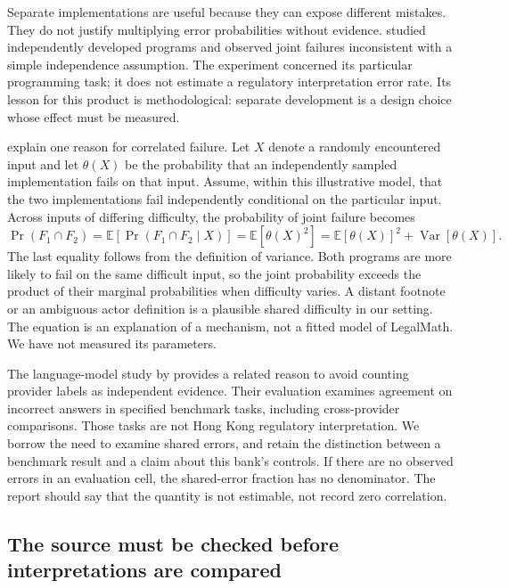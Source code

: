 Separate implementations are useful because they can expose different mistakes.
They do not justify multiplying error probabilities without evidence.
\citet{knight1986diversity} studied independently developed programs and observed
joint failures inconsistent with a simple independence assumption. The experiment
concerned its particular programming task; it does not estimate a regulatory
interpretation error rate. Its lesson for this product is methodological:
separate development is a design choice whose effect must be measured.

\citet[section 4.1]{littlewood2001diversity} explain one reason for correlated
failure. Let $X$ denote a randomly encountered input and let $\theta(X)$ be the
probability that an independently sampled implementation fails on that input.
Assume, within this illustrative model, that the two implementations fail
independently conditional on the particular input. Across inputs of differing
difficulty, the probability of joint failure becomes
\begin{equation}
 \Pr(F_1\cap F_2)
 = \mathbb{E}[\Pr(F_1\cap F_2\mid X)]
 = \mathbb{E}[\theta(X)^2]
 = \mathbb{E}[\theta(X)]^2+\operatorname{Var}[\theta(X)].
 \label{eq:round11-shared-difficulty}
\end{equation}
The last equality follows from the definition of variance. Both programs are
more likely to fail on the same difficult input, so the joint probability exceeds
the product of their marginal probabilities when difficulty varies. A distant
footnote or an ambiguous actor definition is a plausible shared difficulty in
our setting. The equation is an explanation of a mechanism, not a fitted model
of LegalMath. We have not measured its parameters.

The language-model study by \citet{kim2025correlated} provides a related reason
to avoid counting provider labels as independent evidence. Their evaluation
examines agreement on incorrect answers in specified benchmark tasks, including
cross-provider comparisons. Those tasks are not Hong Kong regulatory
interpretation. We borrow the need to examine shared errors, and retain the
distinction between a benchmark result and a claim about this bank's controls.
If there are no observed errors in an evaluation cell, the shared-error fraction
has no denominator. The report should say that the quantity is not estimable,
not record zero correlation.

\subsection{The source must be checked before interpretations are compared}

